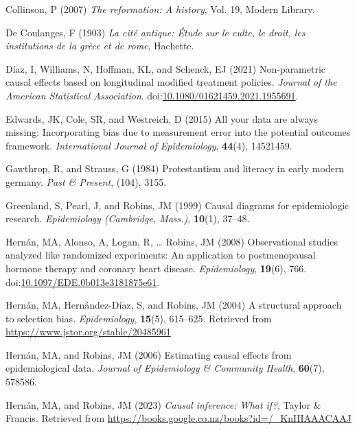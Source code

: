 \documentclass[
  singlecolumn,
  9pt]{article}
\newlength{\cslhangindent}
\newenvironment{CSLReferences}[2] %
 {\begin{list}{}{%
  \setlength{\itemindent}{0pt}
  \setlength{\leftmargin}{0pt}
  \setlength{\parsep}{0pt}
  \ifodd #1
   \setlength{\leftmargin}{\cslhangindent}
   \setlength{\itemindent}{-1\cslhangindent}
  \fi
  \setlength{\itemsep}{#2\baselineskip}}}
 {\end{list}}
\begin{document}
\begin{CSLReferences}{1}{0}
Collinson, P (2007) \emph{The reformation: A history}, Vol. 19, Modern
Library.

De Coulanges, F (1903) \emph{La cité antique: Étude sur le culte, le
droit, les institutions de la grèce et de rome}, Hachette.

Díaz, I, Williams, N, Hoffman, KL, and Schenck, EJ (2021) Non-parametric
causal effects based on longitudinal modified treatment policies.
\emph{Journal of the American Statistical Association}.
doi:\href{https://doi.org/10.1080/01621459.2021.1955691}{10.1080/01621459.2021.1955691}.

Edwards, JK, Cole, SR, and Westreich, D (2015) All your data are always
missing: Incorporating bias due to measurement error into the potential
outcomes framework. \emph{International Journal of Epidemiology},
\textbf{44}(4), 14521459.

Gawthrop, R, and Strauss, G (1984) Protestantism and literacy in early
modern germany. \emph{Past \& Present}, (104), 3155.

Greenland, S, Pearl, J, and Robins, JM (1999) Causal diagrams for
epidemiologic research. \emph{Epidemiology (Cambridge, Mass.)},
\textbf{10}(1), 37--48.

Hernán, MA, Alonso, A, Logan, R, \ldots{} Robins, JM (2008)
Observational studies analyzed like randomized experiments: An
application to postmenopausal hormone therapy and coronary heart
disease. \emph{Epidemiology}, \textbf{19}(6), 766.
doi:\href{https://doi.org/10.1097/EDE.0b013e3181875e61}{10.1097/EDE.0b013e3181875e61}.

Hernán, MA, Hernández-Díaz, S, and Robins, JM (2004) A structural
approach to selection bias. \emph{Epidemiology}, \textbf{15}(5),
615--625. Retrieved from \url{https://www.jstor.org/stable/20485961}

Hernán, MA, and Robins, JM (2006) Estimating causal effects from
epidemiological data. \emph{Journal of Epidemiology \& Community
Health}, \textbf{60}(7), 578586.

Hernán, MA, and Robins, JM (2023) \emph{Causal inference: What if?},
Taylor \& Francis. Retrieved from
\url{https://books.google.co.nz/books?id=/_KnHIAAACAAJ}


\end{CSLReferences}
\end{document}
